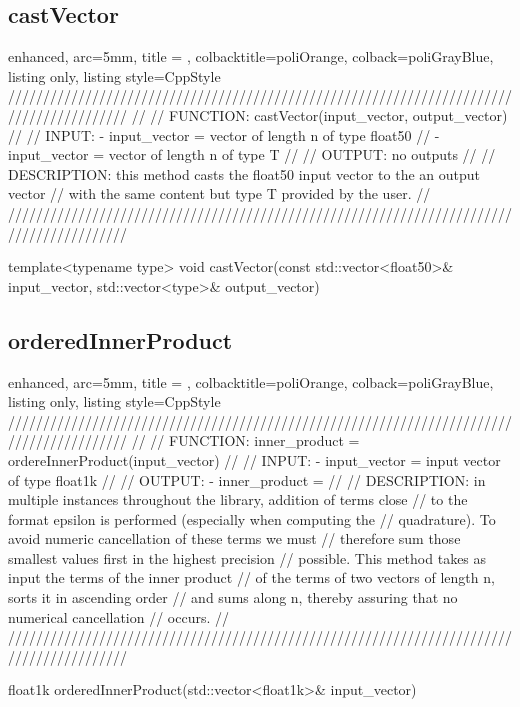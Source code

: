 \documentclass[a4paper, twosided]{book}
\begin{document}
\subsection[castVector]{\changefont castVector}\label{SubSec4.3.1}

\begin{tcblisting}{enhanced,
                   arc=5mm,
                   title = \color{black}{\large \ttfamily Utils.cpp/castVector},
                   colbacktitle=poliOrange,
                   colback=poliGrayBlue,
                   listing only,
                   listing style=CppStyle}
/////////////////////////////////////////////////////////////////////////////////////////
//
//       FUNCTION: castVector(input_vector, output_vector)
//                
//          INPUT: - input_vector = vector of length n of type float50
//                 - input_vector = vector of length n of type T
//
//         OUTPUT: no outputs
//
//    DESCRIPTION: this method casts the float50 input vector to the an output vector
//                 with the same content but type T provided by the user.
//
/////////////////////////////////////////////////////////////////////////////////////////

template<typename type>
void castVector(const std::vector<float50>& input_vector, std::vector<type>& output_vector)
\end{tcblisting}

\subsection[orderedInnerProduct]{\changefont orderedInnerProduct}\label{SubSec4.3.2}

\begin{tcblisting}{enhanced,
                   arc=5mm,
                   title = \color{black}{\large \ttfamily Utils.cpp/orderedInnerProduct},
                   colbacktitle=poliOrange,
                   colback=poliGrayBlue,
                   listing only,
                   listing style=CppStyle}
/////////////////////////////////////////////////////////////////////////////////////////
//
//       FUNCTION: inner_product = ordereInnerProduct(input_vector)
//                
//          INPUT: - input_vector = input vector of type float1k
//
//         OUTPUT: - inner_product = 
//
//    DESCRIPTION: in multiple instances throughout the library, addition of terms close
//                 to the format epsilon is performed (especially when computing the
//                 quadrature). To avoid numeric cancellation of these terms we must 
//                 therefore sum those smallest values first in the highest precision
//                 possible. This method takes as input the terms of the inner product
//                 of the terms of two vectors of length n, sorts it in ascending order
//                 and sums along n, thereby assuring that no numerical cancellation
//                 occurs.
//
/////////////////////////////////////////////////////////////////////////////////////////

float1k orderedInnerProduct(std::vector<float1k>& input_vector)                   
\end{tcblisting}
\end{document}
